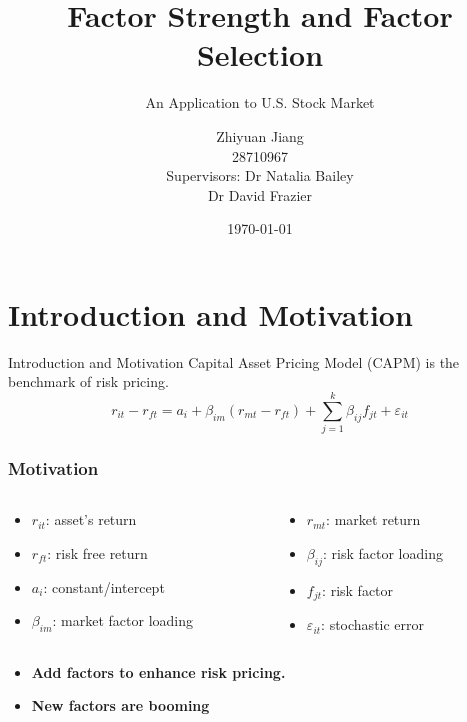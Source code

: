 \documentclass[12pt]{beamer}
\title{Factor Strength and Factor Selection}
\subtitle{An Application to U.S. Stock Market}
\date{\today}
\author[author]{Zhiyuan Jiang\\
			                    28710967\\
			                    [10mm]
			                    {\small Supervisors: Dr Natalia Bailey 
			                    	\\ \hspace{18.5mm} 
			                    	Dr David Frazier}}
\begin{document}
	
\frame{\titlepage}

\section{Introduction and Motivation}

\begin{frame}{Introduction and Motivation}
Capital Asset Pricing Model (CAPM) is the benchmark of risk pricing.
\[r_{it} - r_{ft} = a_i + \beta_{im}(r_{mt} - r_{ft}) + \sum_{j=1}^{k}\beta_{ij}f_{jt} + \varepsilon_{it} \]

\frametitle{Motivation}
\begin{columns}
	\begin{column}{0.5\textwidth}
\begin{itemize}
\item $r_{it}$: asset's return
\item $r_{ft}$: risk free return
\item $a_i$: constant/intercept
\item $\beta_{im}$: market factor loading
\end{itemize}
	\end{column}
	\begin{column}{0.5\textwidth}  
		\begin{center}
\begin{itemize}
\item $r_{mt}$: market return 
\item$\beta_{ij}$: risk factor loading
\item $f_{jt}$: risk factor
\item $\varepsilon_{it}$: stochastic error
\end{itemize}
		\end{center}
	\end{column}
\end{columns}
\begin{itemize}
\item{\bf Add factors to enhance risk pricing.}
\item{\bf  New factors are booming }
\end{itemize}
\end{frame}
\end{document}
